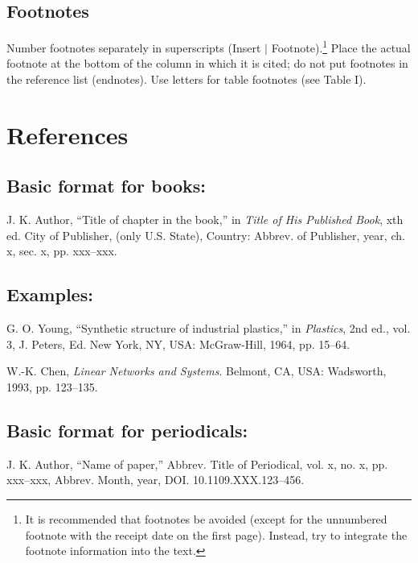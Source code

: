 \documentclass[journal]{IEEEtran}
\begin{document}
\subsection{Footnotes}

Number footnotes separately in superscripts (Insert $\mid$ Footnote).\footnote{It is recommended that footnotes be avoided (except for the unnumbered footnote with the receipt date on the first page). Instead, try to integrate the footnote information into the text.}  Place the actual footnote at the bottom of the column in which it is cited; do not put footnotes in the reference list (endnotes). Use letters for table footnotes (see Table I). 


\section*{References}

\subsection*{Basic format for books:}

J. K. Author, ``Title of chapter in the book,'' in {\em Title of His Published Book}, xth ed. City of Publisher, (only U.S. State), Country: Abbrev. of Publisher, year, ch. x, sec. x, pp. xxx--xxx.

\subsection*{Examples:}
\def\refname{}
\begin{thebibliography}{34}

\bibitem{}G. O. Young, ``Synthetic structure of industrial plastics,'' in {\em Plastics}, 2nd ed., vol. 3, J. Peters, Ed. New York, NY, USA: McGraw-Hill, 1964, pp. 15--64.

\bibitem{}W.-K. Chen, {\it Linear Networks and Systems}. Belmont, CA, USA: Wadsworth, 1993, pp. 123--135.

\end{thebibliography}

\subsection*{Basic format for periodicals:}

J. K. Author, ``Name of paper,'' Abbrev. Title of Periodical, vol. x,   no. x, pp. xxx--xxx, Abbrev. Month, year, DOI. 10.1109.XXX.123--456.
\end{document}
